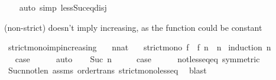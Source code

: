\begin{isabellebody}
%
\isadelimproof
\ \ %
\endisadelimproof
%
\isatagproof
{}\isamarkupfalse%
\ {\isacharparenleft}{\kern0pt}auto\ simp{\isacharcolon}{\kern0pt}\ less{\isacharunderscore}{\kern0pt}Suc{\isacharunderscore}{\kern0pt}eq{\isacharunderscore}{\kern0pt}{}{\isacharunderscore}{\kern0pt}disj{\isacharparenright}{\kern0pt}%
\endisatagproof
{\isafoldproof}%
%
\isadelimproof
%
\endisadelimproof
%
\begin{isamarkuptext}%
 (non-strict) doesn't imply increasing, as the function could be constant%
\end{isamarkuptext}\isamarkuptrue%
\isamarkupfalse%
\ strict{\isacharunderscore}{\kern0pt}mono{\isacharunderscore}{\kern0pt}imp{\isacharunderscore}{\kern0pt}increasing{\isacharcolon}{\kern0pt}\isanewline
\ \ \ n{\isacharcolon}{\kern0pt}{\isacharcolon}{\kern0pt}nat\isanewline
\ \ \ {\isachardoublequoteopen}strict{\isacharunderscore}{\kern0pt}mono\ f{\isachardoublequoteclose}\ \ {\isachardoublequoteopen}f\ n\ {\isasymge}\ n{\isachardoublequoteclose}\isanewline
%
\isadelimproof
%
\endisadelimproof
%
\isatagproof
{}\isamarkupfalse%
\ {\isacharparenleft}{\kern0pt}induction\ n{\isacharparenright}{\kern0pt}\isanewline
\ \ \isamarkupfalse%
\ {}\isanewline
\ \ \isamarkupfalse%
\ \isamarkupfalse%
\ {\isacharquery}{\kern0pt}case\isanewline
\ \ \ \ \isamarkupfalse%
\ auto\isanewline
{}\isamarkupfalse%
\isanewline
\ \ \isamarkupfalse%
\ {\isacharparenleft}{\kern0pt}Suc\ n{\isacharparenright}{\kern0pt}\isanewline
\ \ \isamarkupfalse%
\ \isamarkupfalse%
\ {\isacharquery}{\kern0pt}case\isanewline
\ \ \ \ \isamarkupfalse%
\ not{\isacharunderscore}{\kern0pt}less{\isacharunderscore}{\kern0pt}eq{\isacharunderscore}{\kern0pt}eq\ {\isacharbrackleft}{\kern0pt}symmetric{\isacharbrackright}{\kern0pt}\isanewline
\ \ \ \ \isamarkupfalse%
\ Suc{\isacharunderscore}{\kern0pt}n{\isacharunderscore}{\kern0pt}not{\isacharunderscore}{\kern0pt}le{\isacharunderscore}{\kern0pt}n\ assms\ order{\isacharunderscore}{\kern0pt}trans\ strict{\isacharunderscore}{\kern0pt}mono{\isacharunderscore}{\kern0pt}less{\isacharunderscore}{\kern0pt}eq\ \isamarkupfalse%
\ blast\isanewline
{}\isamarkupfalse%
%
\endisatagproof
{\isafoldproof}%
%
\isadelimproof
%
\endisadelimproof
%
\isadelimdocument
%
\endisadelimdocument
%
\isatagdocument

\end{isabellebody}
